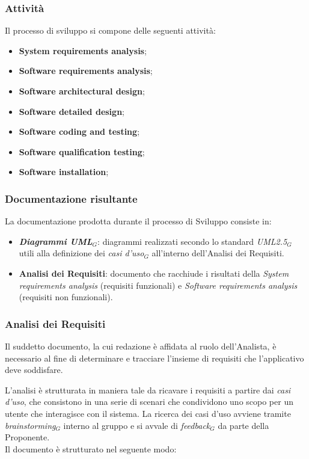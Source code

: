 \documentclass[10pt, letterpaper]{article}
\begin{document}
\subsubsection{Attività}
Il processo di sviluppo si compone delle seguenti attività:
\begin{itemize}
    \item \textbf{System requirements analysis};
    \item \textbf{Software requirements analysis};
    \item \textbf{Software architectural design};
    \item \textbf{Software detailed design};
    \item \textbf{Software coding and testing};
    \item \textbf{Software qualification testing};
    \item \textbf{Software installation};
\end{itemize}

\subsubsection{Documentazione risultante}
La documentazione prodotta durante il processo di Sviluppo consiste in:
\begin{itemize}
    \item \textbf{\textit{Diagrammi UML$_{G}$}}: diagrammi realizzati secondo lo standard \textit{UML2.5$_{G}$} utili alla definizione dei \textit{casi d'uso$_{G}$} all'interno dell'Analisi dei Requisiti.
    \item \textbf{Analisi dei Requisiti}: documento che racchiude i risultati della \textit{System requirements analysis} (requisiti funzionali) e \textit{Software requirements analysis} (requisiti non funzionali).
\end{itemize}

\subsubsection{Analisi dei Requisiti}
Il suddetto documento, la cui redazione è affidata al ruolo dell'Analista, è necessario al fine di determinare e tracciare l'insieme di
requisiti che l'applicativo deve soddisfare.

L'analisi è strutturata in maniera tale da ricavare i requisiti a partire dai \textit{casi d'uso}, che
consistono in una serie di scenari che condividono uno scopo per un utente che interagisce con il sistema. La ricerca dei casi d'uso avviene tramite \textit{brainstorming$_{G}$} interno al gruppo e si
avvale di \textit{feedback$_{G}$} da parte della Proponente.\\
Il documento è strutturato nel seguente modo:
\end{document}
